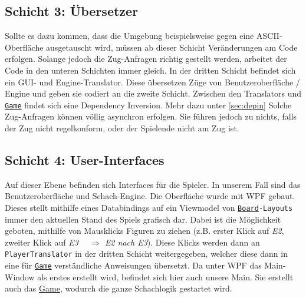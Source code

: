 \documentclass[
10pt, %
a4paper, %
oneside, %
headinclude,footinclude, %
BCOR5mm, %
]{scrartcl}
\begin{document}
\begin{onehalfspace}
\subsection{Schicht 3: Übersetzer}
Sollte es dazu kommen, dass die Umgebung beispielsweise gegen eine ASCII-Oberfläche ausgetauscht wird, müssen ab dieser Schicht Veränderungen am Code erfolgen. Solange jedoch die Zug-Anfragen richtig gestellt werden, arbeitet der Code in den unteren Schichten immer gleich. In der dritten Schicht befindet sich ein GUI- und Engine-Translator. Diese übersetzen Züge von Benutzeroberfläche / Engine und geben sie codiert an die zweite Schicht. Zwischen den Translators und \texttt{\href{https://github.com/schmida736/Chess-AdvancedSE/blob/main/Chess-AdvancedSE/Game\%20Elements/Game.cs}{Game}} findet sich eine Dependency Inversion. Mehr dazu unter \autoref{sec:depin}
Solche Zug-Anfragen können völlig asynchron erfolgen. Sie führen jedoch zu nichts, falls der Zug nicht regelkonform, oder der Spielende nicht am Zug ist.
\subsection{Schicht 4: User-Interfaces}
Auf dieser Ebene befinden sich Interfaces für die Spieler. In unserem Fall sind das Benutzeroberfläche und Schach-Engine. Die Oberfläche wurde mit WPF gebaut. Dieses stellt mithilfe eines Databindings auf ein Viewmodel von \texttt{\href{https://github.com/schmida736/Chess-AdvancedSE/blob/main/Chess-AdvancedSE/Game\%20Elements/Board.cs}{Board}-Layouts} immer den aktuellen Stand des Spiels grafisch dar. 
Dabei ist die Möglichkeit geboten, mithilfe von Mausklicks Figuren zu ziehen (z.B. erster Klick auf \textit{E2}, zweiter Klick auf \textit{E3}~~ $\Rightarrow$ \textit{E2 nach E3}). Diese Klicks werden dann an \texttt{PlayerTranslator} in der dritten Schicht weitergegeben, welcher diese dann in eine für \texttt{\href{https://github.com/schmida736/Chess-AdvancedSE/blob/main/Chess-AdvancedSE/Game\%20Elements/Game.cs}{Game}} verständliche Anweisungen übersetzt.
Da unter WPF das Main-Window als erstes erstellt wird, befindet sich hier auch unsere Main. Sie erstellt auch das \href{https://github.com/schmida736/Chess-AdvancedSE/blob/main/Chess-AdvancedSE/Game\%20Elements/Game.cs}{Game}, wodurch die ganze Schachlogik gestartet wird.


\end{onehalfspace}
\end{document}

